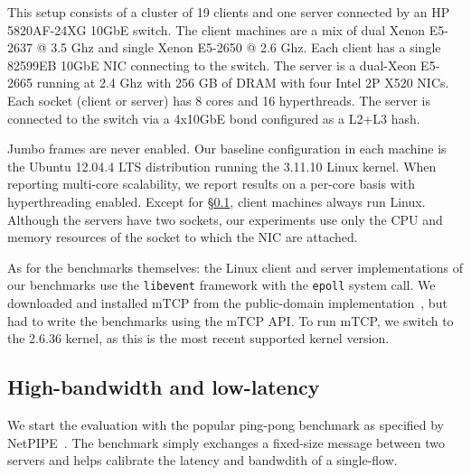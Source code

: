  This setup consists of a cluster of 19
clients and one server connected by an HP 5820AF-24XG 10GbE switch.
The client machines are a mix of dual Xenon E5-2637 @ 3.5 Ghz
and single Xenon E5-2650 @ 2.6 Ghz.  Each client has a single
82599EB 10GbE NIC connecting to the switch.  The server is a dual-Xeon
E5-2665 running at 2.4 Ghz with 256 GB of DRAM with four Intel 2P X520
NICs.  Each socket (client or server) has 8 cores and 16 hyperthreads.
The server is connected to the switch via a 4x10GbE bond configured as a L2+L3 hash.

 Jumbo frames are never enabled.  Our
baseline configuration in each machine is the Ubuntu 12.04.4 LTS
distribution running the 3.11.10 Linux kernel.  When reporting
multi-core scalability, we report results on a per-core basis with
hyperthreading enabled.  Except for \S\ref{sec:eval:netpipe}, client
machines always run Linux. Although the servers have two sockets, our
experiments use only the CPU and memory resources of the socket to
which the NIC are attached.



%




As for the benchmarks themselves: the Linux client and server
implementations of our benchmarks use the \texttt{libevent} framework
with the \texttt{epoll} system call.  We downloaded and installed mTCP
from the public-domain implementation~\cite{url:mtcp}, but had to
write the benchmarks using the mTCP API.  To run mTCP, we switch to the
2.6.36 kernel, as this is the most recent supported kernel version.

\subsection{High-bandwidth and low-latency}
\label{sec:eval:netpipe}


We start the evaluation with the popular ping-pong benchmark as
specified by NetPIPE~\cite{snell1996netpipe}. The benchmark simply
exchanges a fixed-size message between two servers and helps
calibrate the latency and bandwdith of a single-flow.

